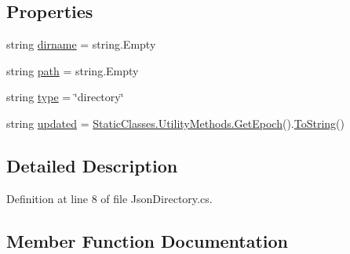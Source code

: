 \subsection*{Properties}
\begin{DoxyCompactItemize}
\item 
string \mbox{\hyperlink{class_little_weeb_library_1_1_models_1_1_json_directory_a85ca592b7c664bc94b3d1619e6c6beef}{dirname}} = string.\+Empty
\item 
string \mbox{\hyperlink{class_little_weeb_library_1_1_models_1_1_json_directory_a7bd33103cb444da0436a3369edcffa19}{path}} = string.\+Empty
\item 
string \mbox{\hyperlink{class_little_weeb_library_1_1_models_1_1_json_directory_ac6178c963cbe9e15834066ed048fc1d9}{type}} = \char`\"{}directory\char`\"{}
\item 
string \mbox{\hyperlink{class_little_weeb_library_1_1_models_1_1_json_directory_aa6ff9e2e4fabee594670b7cd93fa2c69}{updated}} = \mbox{\hyperlink{class_little_weeb_library_1_1_static_classes_1_1_utility_methods_a12336d9e64983ddabaad8950486fafb2}{Static\+Classes.\+Utility\+Methods.\+Get\+Epoch}}().\mbox{\hyperlink{class_little_weeb_library_1_1_models_1_1_json_directory_a8fb3f3abbc3d89fa3a3fc6f7966fc4f9}{To\+String}}()
\end{DoxyCompactItemize}


\subsection{Detailed Description}


Definition at line 8 of file Json\+Directory.\+cs.



\subsection{Member Function Documentation}
\mbox{\label{class_little_weeb_library_1_1_models_1_1_json_directory_a3527cf5cff598f63b5f95cf7d6158b55}} 
